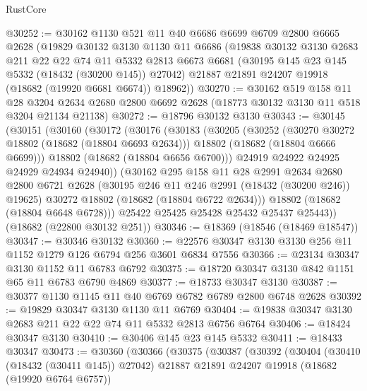 \begin{lexlean}{RustCore}
\begin{coremodule}
@30252 := @30162
    @1130
    @521
    @11
    @40
    @6686
    @6699
    @6709
    @2800
    @6665
    @2628
    (@19829
      @30132
      @3130
      @1130
      @11
      @6686
      (@19838
        @30132
        @3130
        @2683
        @211
        @22
        @22
        @74
        @11
        @5332
        @2813
        @6673
        @6681
        (@30195 @145 @23 @145 @5332 (@18432 (@30200 @145)) @27042)
        @21887
        @21891
        @24207
        @19918
        (@18682 (@19920 @6681 @6674))
        @18962))
@30270 := @30162
    @519
    @158
    @11
    @28
    @3204
    @2634
    @2680
    @2800
    @6692
    @2628
    (@18773 @30132 @3130 @11 @518 @3204 @21134 @21138)
@30272 := @18796 @30132 @3130
@30343 := @30145
    (@30151
      (@30160
        (@30172
          (@30176
            (@30183
              (@30205
                (@30252
                  (@30270 @30272 @18802 (@18682 (@18804 @6693 @2634)))
                  @18802
                  (@18682 (@18804 @6666 @6699)))
                @18802
                (@18682 (@18804 @6656 @6700)))
              @24919
              @24922
              @24925
              @24929
              @24934
              @24940))
          (@30162
            @295
            @158
            @11
            @28
            @2991
            @2634
            @2680
            @2800
            @6721
            @2628
            (@30195 @246 @11 @246 @2991 (@18432 (@30200 @246)) @19625)
            @30272
            @18802
            (@18682 (@18804 @6722 @2634)))
          @18802
          (@18682 (@18804 @6648 @6728)))
        @25422
        @25425
        @25428
        @25432
        @25437
        @25443))
    (@18682 (@22800 @30132 @251))
@30346 := @18369 (@18546 (@18469 @18547))
@30347 := @30346 @30132
@30360 := @22576 @30347 @3130 @3130 @256 @11 @1152 @1279 @126 @6794 @256 @3601 @6834 @7556
@30366 := @23134 @30347 @3130 @1152 @11 @6783 @6792
@30375 := @18720 @30347 @3130 @842 @1151 @65 @11 @6783 @6790 @4869
@30377 := @18733 @30347 @3130
@30387 := @30377 @1130 @1145 @11 @40 @6769 @6782 @6789 @2800 @6748 @2628
@30392 := @19829 @30347 @3130 @1130 @11 @6769
@30404 := @19838 @30347 @3130 @2683 @211 @22 @22 @74 @11 @5332 @2813 @6756 @6764
@30406 := @18424 @30347 @3130
@30410 := @30406 @145 @23 @145 @5332
@30411 := @18433 @30347
@30473 := @30360
    (@30366
      (@30375
        (@30387
          (@30392
            (@30404
              (@30410 (@18432 (@30411 @145)) @27042)
              @21887
              @21891
              @24207
              @19918
              (@18682 (@19920 @6764 @6757))

\end{coremodule}
\end{lexlean}
